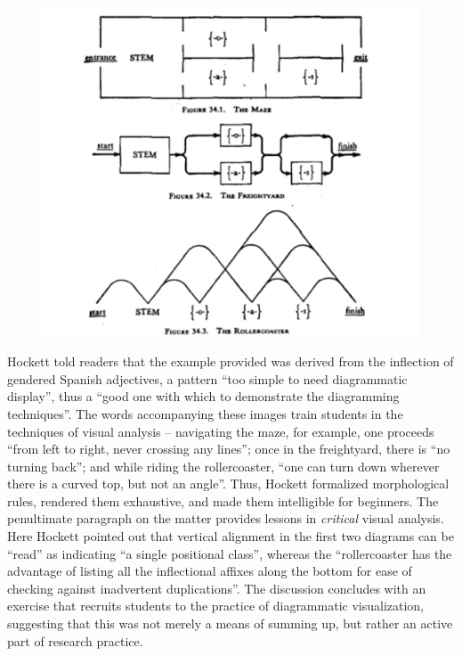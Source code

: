 \documentclass[output=paper]{langscibook}
\begin{document}
\begin{figure}
    \centering
    \includegraphics[scale=1]{figures/hockett1958-291.png}
    \caption{\citet[291]{Hockett19591958}}
    \label{fig:kaplan:hockett1959291}
\end{figure}

Hockett told readers that the example provided was derived from the inflection of gendered Spanish adjectives, a pattern ``too simple to need diagrammatic display'', thus a ``good one with which to demonstrate the diagramming techniques''. The words accompanying these images train students in the techniques of visual analysis – navigating the maze, for example, one proceeds ``from left to right, never crossing any lines''; once in the freightyard, there is ``no turning back''; and while riding the rollercoaster, ``one can turn down wherever there is a curved top, but not an angle''. Thus, Hockett formalized morphological rules, rendered them exhaustive, and made them intelligible for beginners. The penultimate paragraph on the matter provides lessons in \emph{critical} visual analysis. Here Hockett pointed out that vertical alignment in the first two diagrams can be ``read'' as indicating ``a single positional class'', whereas the ``rollercoaster has the advantage of listing all the inflectional affixes along the bottom for ease of checking against inadvertent duplications''. The discussion concludes with an exercise that recruits students to the practice of diagrammatic visualization, suggesting that this was not merely a means of summing up, but rather an active part of research practice.
\end{document}

